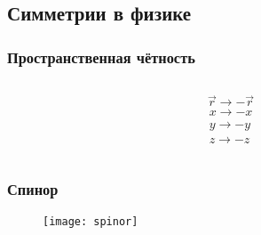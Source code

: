 \subsection{Симметрии в физике}
\begin{frame}
    \frametitle{Пространственная чётность}
    \begin{columns}
        \begin{column}{0.5\textwidth}
            \begin{equation*}
                \vec{r} \to - \vec{r}
            \end{equation*}
            \begin{equation*}
                \begin{array}{c}
                    x \to -x \\
                    y \to -y \\
                    z \to -z
                \end{array}
            \end{equation*}
            \vspace{0.3cm}
        \end{column}
    \end{columns}
\end{frame}

\begin{frame}
    \frametitle{Спинор}
    \begin{figure}
        \begin{centering}
            \texttt{[image: spinor]}
        \end{centering}
    \end{figure}
\end{frame}

